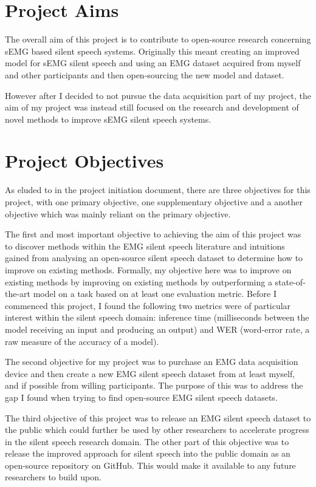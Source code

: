 \section{Project Aims}

The overall aim of this project is to contribute to open-source research concerning
sEMG based silent speech systems. Originally this meant creating an improved model
for sEMG silent speech and using an EMG dataset acquired from myself and other
participants and then open-sourcing the new model and dataset.

However after I decided to not pursue the data acquisition part of my project,
the aim of my project was instead still focused on the research and development
of novel methods to improve sEMG silent speech systems.

\section{Project Objectives}

As eluded to in the project initiation document, there are three objectives
for this project, with one primary objective, one supplementary objective
and a another objective which was mainly reliant on the primary objective.

The first and most important objective to achieving the aim of this project
was to discover methods within the EMG silent speech literature and intuitions
gained from analysing an open-source silent speech dataset to determine how
to improve on existing methods.
Formally, my objective here was to improve on existing methods by improving
on existing methods by outperforming a state-of-the-art model on a task
based on at least one evaluation metric. Before I commenced this project,
I found the following two metrics were of particular interest within the
silent speech domain: inference time (milliseconds between the model
receiving an input and producing an output) and WER (word-error rate,
a raw measure of the accuracy of a model).

The second objective for my project was to purchase an EMG data acquisition
device and then create a new EMG silent speech dataset from at least
myself, and if possible from willing participants. The purpose of this
was to address the gap I found when trying to find open-source EMG silent
speech datasets.

The third objective of this project was to release an EMG silent speech
dataset to the public which could further be used by other researchers
to accelerate progress in the silent speech research domain. The other
part of this objective was to release the improved approach for silent
speech into the public domain as an open-source repository on GitHub.
This would make it available to any future researchers to build upon.